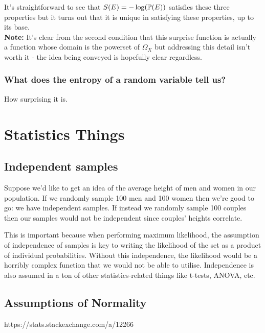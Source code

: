 \documentclass[11pt]{article}
\begin{document}
\begin{appendices}
\noindent It's straightforward to see that $S(E)=-\log(\P(E))$ satisfies these three properties but it turns out that it is unique in satisfying these properties, up to its base.\\

\noindent\textbf{Note:} It's clear from the second condition that this surprise function is actually a function whose domain is the powerset of $\Omega_X$ but addressing this detail isn't worth it - the idea being conveyed is hopefully clear regardless.

\subsubsection{What does the entropy of a random variable tell us?}
How surprising it is.

\section{Statistics Things}

\subsection{Independent samples}
Suppose we'd like to get an idea of the average height of men and women in our population. If we randomly sample 100 men and 100 women then we're good to go: we have independent samples. If instead we randomly sample 100 couples then our samples would not be independent since couples' heights correlate.

This is important because when performing maximum likelihood, the assumption of independence of samples is key to writing the likelihood of the set as a product of individual probabilities. Without this independence, the likelihood would be a horribly complex function that we would not be able to utilise. Independence is also assumed in a ton of other statistics-related things like t-tests, ANOVA, etc.

\subsection{Assumptions of Normality}
https://stats.stackexchange.com/a/12266

\end{appendices}
\end{document}
